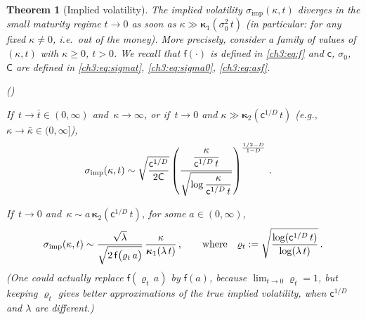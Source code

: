\documentclass[a4paper,reqno,11pt]{amsart}
\numberwithin{equation}{section}
\newtheorem{theorem}{Theorem}[section]
\renewcommand{\epsilon}{\varepsilon}
\renewcommand{\rho}{\varrho}
\newcommand\sfc{\mathsf{c}}
\newcommand\sff{\mathsf{f}}
\newcommand\sfC{\mathsf{C}}
\newenvironment{aenumerate}{%
\renewcommand{\theenumi}{\alph{enumi}}%
\renewcommand{\labelenumi}{{\rm(\theenumi)}}%
\begin{list}{\labelenumi}
	{%
	\setlength{\itemsep}{0.4em}%
	\setlength{\topsep}{0.5em}%
	\setlength\leftmargin{2.45em}%
	\setlength\labelwidth{2.05em}%
	\setlength{\labelsep}{0.4em}%
	\usecounter{enumi}%
	}%
	}%
{\end{list}
}
\newcommand\imp{\mathrm{imp}}
\newcommand\bkappa{\boldsymbol{\kappa}}
\newcommand\blue{\color{blue}}
\begin{document}
\begin{theorem}[Implied volatility]\label{ch3:th:main}
The implied volatility $\sigma_\imp(\kappa,t)$ diverges
in the small maturity regime $t \to 0$ as soon as $\kappa \gg 
\bkappa_1(\sigma_0^2 \, t)$ 
(in particular: for any fixed $\kappa \ne 0$, i.e.\ out of the money). 
More precisely, consider a family of values of $(\kappa,t)$ with $\kappa \ge 0$, $t > 0$. 
We recall that $\sff(\cdot)$
is defined in \eqref{ch3:eq:f} and $\sfc$, $\sigma_0$, $\sfC$ are defined in 
\eqref{ch3:eq:sigmat},
\eqref{ch3:eq:sigma0}, \eqref{ch3:eq:asf}.

\begin{aenumerate}
\item\label{iv:a} If $\,t \to \bar t \in (0,\infty)$ and $\,\kappa \to \infty$, 
or if $\,t \to 0$ and $\kappa \gg \bkappa_2(\sfc^{1/D} \, t)$ (e.g.,
$\kappa \to \bar\kappa \in (0,\infty]$),
\begin{equation}\label{ch3:eq:smile}
\begin{split}
\sigma_\imp(\kappa,t) & \sim 
\sqrt{\frac{\sfc^{1/D}}{2 \sfC}} 
	\left(\frac{\rule[-1em]{0pt}{1em}\displaystyle\frac{\kappa}{\sfc^{1/D} \, t}}
	{\displaystyle\sqrt{\log \frac{\kappa}{\sfc^{1/D} \, t}}}\right)^{\frac{1/2-D}{1-D}} 
	\,.
\end{split}
\end{equation}

\item\label{iv:b} If $\,t\to 0$ and 
$\, \kappa \sim a \, \bkappa_2(\sfc^{1/D} \, t)$, for some $a \in (0,\infty)$,
\begin{equation}\label{ch3:eq:smile2}
	\rule{0pt}{1.3em}
	\sigma_\imp(\kappa,t)\sim 
	\frac{\sqrt{\lambda}}{\sqrt{2\, 
	\sff\big( \rho_t \, a \big)}} 
	\,
	\frac{\kappa}{\bkappa_1(\lambda \, t)} \,, \qquad
	\text{where} \quad 
	\rho_t := \sqrt{\frac{\log (\sfc^{1/D} \, t)}{\log (\lambda \, t)} } \,.
\end{equation}
(One could actually replace $\sff(\rho_t \, a)$ by $\sff(a)$,
because $\lim_{t\to 0} \rho_t = 1$,
but keeping $\rho_t$ gives better approximations of the true
implied volatility, when $\sfc^{1/D}$ and $\lambda$ are different.)
 

\end{aenumerate}
\end{theorem}
\end{document}
